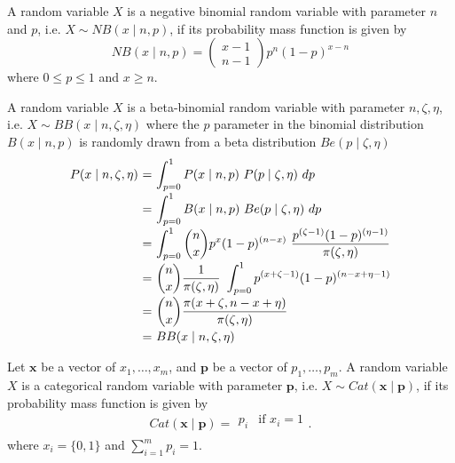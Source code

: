 \begin{definition2}
	A random variable $X$ is a negative binomial random variable with parameter $n$ and $p$, i.e. $X \sim NB(x \mid n, p)$, if its probability mass function is given by
	\[
	NB(x \mid n, p) = \begin{pmatrix} x - 1 \\ n - 1 \end{pmatrix} p^n (1 - p)^{x-n}
	\]
	\noindent where $0 \leq p \leq 1$ and $x \geq n$.
\end{definition2}

\begin{definition2}
	A random variable $X$ is a beta-binomial random variable with parameter $n, \zeta, \eta$, i.e. $X \sim BB(x \mid n, \zeta, \eta)$ where the $p$ parameter in the binomial distribution $B(x \mid n, p)$ is randomly drawn from a beta distribution $Be(p \mid \zeta, \eta)$ 
	\begin{equation*}
	\begin{tabular}{r@{ = }l}
	$P(x \mid n, \zeta, \eta)$ & $\displaystyle\int_{p=0}^{1} P(x \mid n, p) ~ P(p \mid \zeta, \eta) ~dp$ \\ [2ex]
	& $\displaystyle\int_{p=0}^{1} B(x \mid n, p) ~ Be(p \mid \zeta, \eta) ~dp$ \\ [2ex]
	& $\displaystyle\int_{p=0}^{1} \binom{n}{x} p^x (1-p)^{(n-x)} ~ \displaystyle\frac{p^{(\zeta - 1)} (1-p)^{(\eta-1)}}{\pi(\zeta, \eta)}$ \\ [2ex]
	& $\displaystyle\binom nx \displaystyle\frac{1}{\pi(\zeta, \eta)} ~ \displaystyle\int_{p=0}^{1} p^{(x+\zeta-1)} (1-p)^{(n-x+\eta-1)}$ \\ [2ex]
	& $\displaystyle\binom nx \displaystyle\frac{\pi(x+\zeta, n-x+\eta)}{\pi(\zeta, \eta)}$ \\ [2ex]
	& $BB(x \mid n, \zeta, \eta)$
	\end{tabular}
	\end{equation*}
\end{definition2}

\begin{definition2}
	Let $\mathbf{x}$ be a vector of $x_1, \ldots, x_m$, and $\mathbf p$ be a vector of $p_1, \ldots, p_m$. A random variable $X$ is a categorical random variable with parameter $\mathbf p$, i.e. $X \sim Cat(\mathbf x \mid \mathbf p)$, if its probability mass function is given by
	\[
	Cat(\mathbf x \mid \mathbf p) = \begin{matrix}
	p_i & \textrm{if } x_i = 1 \\
	\end{matrix}.
	\]
	\noindent where $x_i = \{0, 1\}$ and $\displaystyle\sum_{i=1}^{m} p_i = 1$.
\end{definition2}

